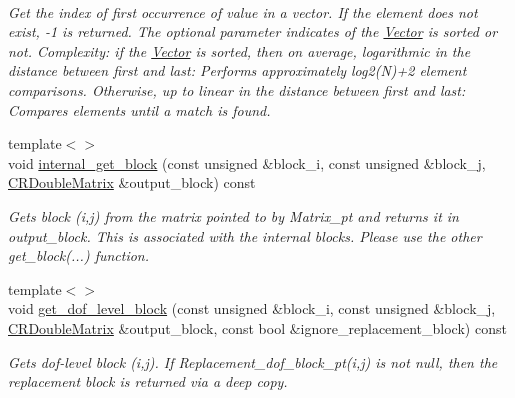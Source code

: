 \begin{DoxyCompactItemize}
$$\begin{DoxyCompactList}\small\item\em Get the index of first occurrence of value in a vector. If the element does not exist, -\/1 is returned. The optional parameter indicates of the \hyperlink{classoomph_1_1Vector}{Vector} is sorted or not. Complexity\+: if the \hyperlink{classoomph_1_1Vector}{Vector} is sorted, then on average, logarithmic in the distance between first and last\+: Performs approximately log2(\+N)+2 element comparisons. Otherwise, up to linear in the distance between first and last\+: Compares elements until a match is found. \end{DoxyCompactList}\item 
{\footnotesize template$<$$>$ }\\void \hyperlink{classoomph_1_1BlockPreconditioner_a4c824a95d71ce68ee7e1acf6d45178e3}{internal\+\_\+get\+\_\+block} (const unsigned \&block\+\_\+i, const unsigned \&block\+\_\+j, \hyperlink{classoomph_1_1CRDoubleMatrix}{C\+R\+Double\+Matrix} \&output\+\_\+block) const
\begin{DoxyCompactList}\small\item\em Gets block (i,j) from the matrix pointed to by Matrix\+\_\+pt and returns it in output\+\_\+block. This is associated with the internal blocks. Please use the other get\+\_\+block(...) function. \end{DoxyCompactList}\item 
{\footnotesize template$<$$>$ }\\void \hyperlink{classoomph_1_1BlockPreconditioner_a27943f064e188f326f378ea02522c267}{get\+\_\+dof\+\_\+level\+\_\+block} (const unsigned \&block\+\_\+i, const unsigned \&block\+\_\+j, \hyperlink{classoomph_1_1CRDoubleMatrix}{C\+R\+Double\+Matrix} \&output\+\_\+block, const bool \&ignore\+\_\+replacement\+\_\+block) const
\begin{DoxyCompactList}\small\item\em Gets dof-\/level block (i,j). If Replacement\+\_\+dof\+\_\+block\+\_\+pt(i,j) is not null, then the replacement block is returned via a deep copy. \end{DoxyCompactList}\end{DoxyCompactItemize}

